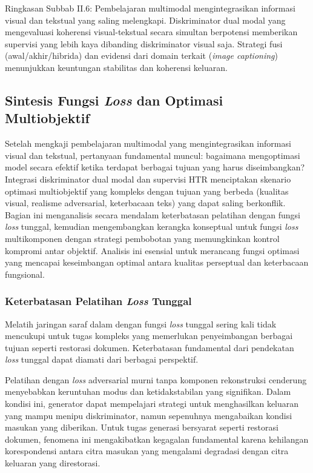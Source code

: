 Ringkasan Subbab II.6: Pembelajaran multimodal mengintegrasikan informasi visual dan tekstual yang saling melengkapi. Diskriminator dual modal yang mengevaluasi koherensi visual-tekstual secara simultan berpotensi memberikan supervisi yang lebih kaya dibanding diskriminator visual saja. Strategi fusi (awal/akhir/hibrida) dan evidensi dari domain terkait (\textit{image captioning}) menunjukkan keuntungan stabilitas dan koherensi keluaran.


\subsection{Sintesis Fungsi \textit{Loss} dan Optimasi Multiobjektif}
\label{subsec:loss-functions}

Setelah mengkaji pembelajaran multimodal yang mengintegrasikan informasi visual dan tekstual, pertanyaan fundamental muncul: bagaimana mengoptimasi model secara efektif ketika terdapat berbagai tujuan yang harus diseimbangkan? Integrasi diskriminator dual modal dan supervisi HTR menciptakan skenario optimasi multiobjektif yang kompleks dengan tujuan yang berbeda (kualitas visual, realisme adversarial, keterbacaan teks) yang dapat saling berkonflik. Bagian ini menganalisis secara mendalam keterbatasan pelatihan dengan fungsi \textit{loss} tunggal, kemudian mengembangkan kerangka konseptual untuk fungsi \textit{loss} multikomponen dengan strategi pembobotan yang memungkinkan kontrol kompromi antar objektif. Analisis ini esensial untuk merancang fungsi optimasi yang mencapai keseimbangan optimal antara kualitas perseptual dan keterbacaan fungsional.

\subsubsection{Keterbatasan Pelatihan \textit{Loss} Tunggal}
\label{subsubsec:single-loss-limits}

Melatih jaringan saraf dalam dengan fungsi \textit{loss} tunggal sering kali tidak mencukupi untuk tugas kompleks yang memerlukan penyeimbangan berbagai tujuan seperti restorasi dokumen. Keterbatasan fundamental dari pendekatan \textit{loss} tunggal dapat diamati dari berbagai perspektif.

Pelatihan dengan \textit{loss} adversarial murni tanpa komponen rekonstruksi cenderung menyebabkan keruntuhan modus dan ketidakstabilan yang signifikan. Dalam kondisi ini, generator dapat mempelajari strategi untuk menghasilkan keluaran yang mampu menipu diskriminator, namun sepenuhnya mengabaikan kondisi masukan yang diberikan. Untuk tugas generasi bersyarat seperti restorasi dokumen, fenomena ini mengakibatkan kegagalan fundamental karena kehilangan korespondensi antara citra masukan yang mengalami degradasi dengan citra keluaran yang direstorasi.

